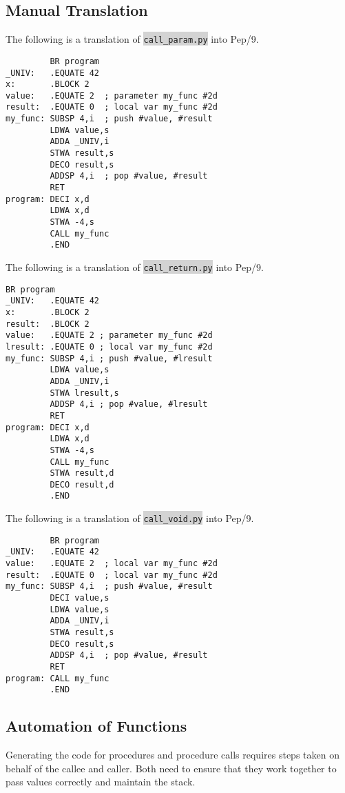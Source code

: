 \documentclass[12pt]{article}
\newcommand{\code}[1]{\colorbox{LightGray}{\texttt{#1}}}
\begin{document}
\subsection*{Manual Translation}
The following is a translation of \code{call\_param.py} into Pep/9.
\begin{verbatim}
         BR program
_UNIV:   .EQUATE 42
x:       .BLOCK 2
value:   .EQUATE 2  ; parameter my_func #2d
result:  .EQUATE 0  ; local var my_func #2d
my_func: SUBSP 4,i  ; push #value, #result
         LDWA value,s
         ADDA _UNIV,i
         STWA result,s
         DECO result,s
         ADDSP 4,i  ; pop #value, #result
         RET
program: DECI x,d
         LDWA x,d
         STWA -4,s
         CALL my_func
         .END
\end{verbatim}
The following is a translation of \code{call\_return.py} into Pep/9.
\begin{verbatim}
BR program
_UNIV:   .EQUATE 42
x:       .BLOCK 2
result:  .BLOCK 2
value:   .EQUATE 2 ; parameter my_func #2d
lresult: .EQUATE 0 ; local var my_func #2d
my_func: SUBSP 4,i ; push #value, #lresult
         LDWA value,s
         ADDA _UNIV,i
         STWA lresult,s
         ADDSP 4,i ; pop #value, #lresult
         RET
program: DECI x,d
         LDWA x,d
         STWA -4,s
         CALL my_func
         STWA result,d 
         DECO result,d 
         .END 
\end{verbatim}
The following is a translation of \code{call\_void.py} into Pep/9.
\begin{verbatim}
         BR program
_UNIV:   .EQUATE 42
value:   .EQUATE 2  ; local var my_func #2d
result:  .EQUATE 0  ; local var my_func #2d
my_func: SUBSP 4,i  ; push #value, #result
         DECI value,s
         LDWA value,s
         ADDA _UNIV,i
         STWA result,s
         DECO result,s
         ADDSP 4,i  ; pop #value, #result
         RET
program: CALL my_func
         .END
\end{verbatim}

\subsection*{Automation of Functions}
Generating the code for procedures and procedure calls requires steps taken on behalf of the callee and caller. Both need to ensure that they work together to pass values correctly and maintain the stack. \\
\end{document}
